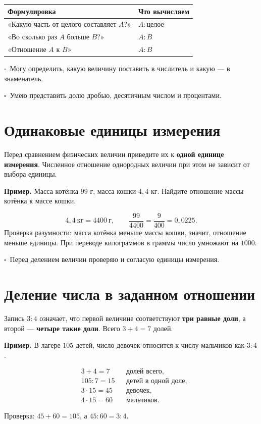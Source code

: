 \documentclass[a4paper,12pt]{article}
\newcommand{\example}[1]{\par\medskip\textcolor{darkaccent}{\textbf{Пример.}} #1\par}
\newcommand{\checkmarkline}[1]{\par\smallskip\textcolor{darkaccent}{$\square$}\ #1\par}
\begin{document}
\medskip
\begin{tabularx}{\linewidth}{@{}X X@{}}
\toprule
\textcolor{darkaccent}{Формулировка} & \textcolor{darkaccent}{Что вычисляем}\\
\midrule
«Какую часть от целого составляет $A$?» & $A:\text{целое}$\\
«Во сколько раз $A$ больше $B$?» & $A:B$\\
«Отношение $A$ к $B$» & $A:B$\\
\bottomrule
\end{tabularx}

\checkmarkline{Могу определить, какую величину поставить в числитель и какую --- в знаменатель.}
\checkmarkline{Умею представить долю дробью, десятичным числом и процентами.}

\section{Одинаковые единицы измерения}
Перед сравнением физических величин приведите их к \textbf{одной единице измерения}.
Численное отношение однородных величин при этом не зависит от выбора единицы.

\example{Масса котёнка $99$ г, масса кошки $4{,}4$ кг. Найдите отношение массы котёнка к массе кошки.}
\[
4{,}4\ \text{кг}=4400\ \text{г},\qquad
\frac{99}{4400}=\boxed{\frac9{400}}=0{,}0225.
\]
Проверка разумности: масса котёнка меньше массы кошки, значит, отношение меньше единицы.
При переводе килограммов в граммы число умножают на $1000$.

\checkmarkline{Перед делением величин проверяю и согласую единицы измерения.}

\section{Деление числа в заданном отношении}
Запись $3:4$ означает, что первой величине соответствуют \textbf{три равные доли},
а второй --- \textbf{четыре такие доли}. Всего $3+4=7$ долей.

\example{В лагере $105$ детей, число девочек относится к числу мальчиков как $3:4$.}
\begin{align*}
&3+4=7 &&\text{долей всего},\\
&105:7=15 &&\text{детей в одной доле},\\
&3\cdot15=\boxed{45} &&\text{девочек},\\
&4\cdot15=\boxed{60} &&\text{мальчиков}.
\end{align*}
\begin{center}
\end{center}
Проверка: $45+60=105$, а $45:60=3:4$.
\end{document}
